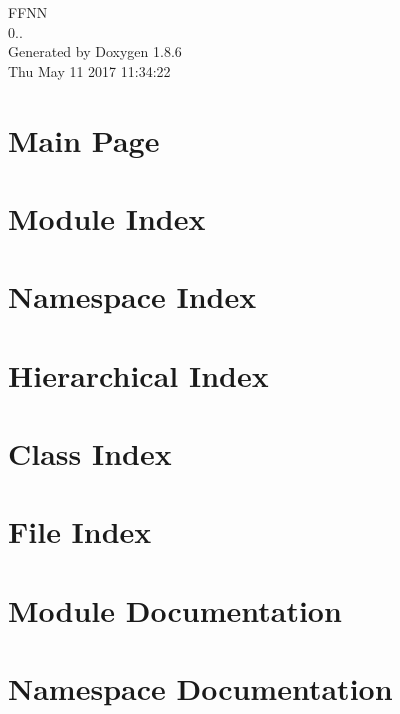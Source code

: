 \documentclass[twoside]{book}
\newcommand{\clearemptydoublepage}{%
  \newpage{\pagestyle{empty}\cleardoublepage}%
}
\begin{document}
\hypersetup{pageanchor=false}
\begin{titlepage}
\vspace*{7cm}
\begin{center}%
{\Large F\-F\-N\-N \\[1ex]\large 0.. }\\
\vspace*{1cm}
{\large Generated by Doxygen 1.8.6}\\
\vspace*{0.5cm}
{\small Thu May 11 2017 11:34:22}\\
\end{center}
\end{titlepage}
\clearemptydoublepage
\tableofcontents
\clearemptydoublepage
{}
\hypersetup{pageanchor=true}

\chapter{Main Page}
\label{index}\hypertarget{index}{}
\chapter{Module Index}

\chapter{Namespace Index}

\chapter{Hierarchical Index}

\chapter{Class Index}

\chapter{File Index}

\chapter{Module Documentation}

\chapter{Namespace Documentation}














\end{document}
